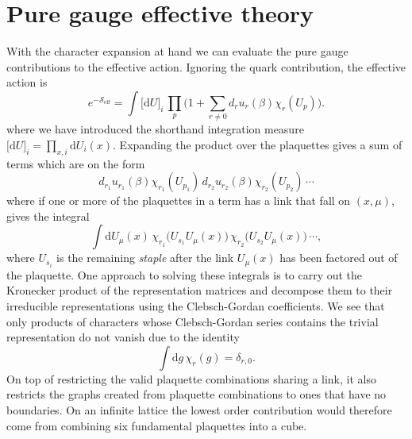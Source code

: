 \section{Pure gauge effective theory} \label{sec:pure-gauge-theory}

With the character expansion at hand we can evaluate the pure gauge
contributions to the effective action. Ignoring the quark contribution, the
effective action is
%
\begin{equation}
  e^{-\mathcal{S}_{\text{eff}}} = \int \big[ \mathrm{d} U \big]_i \, \prod_p
    \bigg(1 + \sum_{r \neq 0} d_r u_r(\beta) \chi_r (U_p) \bigg).
\end{equation}
%
where we have introduced the shorthand integration measure $\big[ \mathrm{d} U
\big]_i = \prod_{x,i} \mathrm{d} U_{i}(x)$.  Expanding the product over the
plaquettes gives a sum of terms which are on the form
%
\begin{equation}
  d_{r_1} u_{r_1}(\beta) \chi_{r_1}(U_{p_1}) \, 
  d_{r_2} u_{r_2}(\beta) \chi_{r_2}(U_{p_2}) \, \cdots
\end{equation}
%
where if one or more of the plaquettes in a term has a link that fall on
$(x,\mu)$, gives the integral
%
\begin{equation}
  \int \mathrm{d} U_{\mu}(x) \, \chi_{r_1} \big(U_{s_1} U_{\mu}(x) \big) \,
    \chi_{r_2} \big(U_{s_2} U_{\mu}(x) \big) \, \cdots,
\end{equation}
%
where $U_{s_i}$ is the remaining \emph{staple} after the link $U_{\mu}(x)$ has
been factored out of the plaquette. One approach to solving these integrals is
to carry out the Kronecker product of the representation matrices and
decompose them to their irreducible representations using the Clebsch-Gordan
coefficients. We see that only products of characters whose Clebsch-Gordan
series contains the trivial representation do not vanish due to the identity
%
\begin{equation}
  \int \mathrm{d} g \, \chi_r (g) = \delta_{r,0}.
\end{equation}
%
On top of restricting the valid plaquette combinations sharing a link, it also
restricts the graphs created from plaquette combinations to ones that have no
boundaries. On an infinite lattice the lowest order contribution would therefore
come from combining six fundamental plaquettes into a cube.

